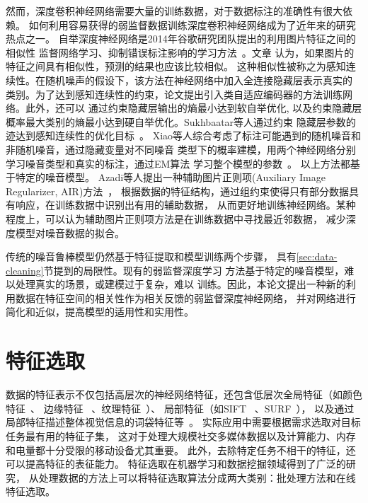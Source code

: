\documentclass[doctor]{ustcthesis}
\begin{document}
然而，深度卷积神经网络需要大量的训练数据，对于数据标注的准确性有很大依赖。
如何利用容易获得的弱监督数据训练深度卷积神经网络成为了近年来的研究热点之一。
自举深度神经网络是2014年谷歌研究团队提出的利用图片特征之间的相似性
监督网络学习、抑制错误标注影响的学习方法~\cite{reed2014training}。文章
认为，如果图片的特征之间具有相似性，预测的结果也应该比较相似。
这种相似性被称之为感知连续性。在随机噪声的假设下，该方法在神经网络中加入全连接隐藏层表示真实的
类别。为了达到感知连续性的约束，论文提出引入类自适应编码器的方法训练网络。此外，还可以
通过约束隐藏层输出的熵最小达到软自举优化,
以及约束隐藏层概率最大类别的熵最小达到硬自举优化。Sukhbaatar等人通过约束
隐藏层参数的迹达到感知连续性的优化目标~\cite{sukhbaatar2014training}。
Xiao等人综合考虑了标注可能遇到的随机噪音和非随机噪音，通过隐藏变量对不同噪音
类型下的概率建模，用两个神经网络分别学习噪音类型和真实的标注，通过EM算法
学习整个模型的参数~\cite{xiao2015learning}。 以上方法都基于特定的噪音模型。
Azadi等人提出一种辅助图片正则项(Auxiliary Image Regularizer, AIR)方法~\cite{azadi2015auxiliary}，
根据数据的特征结构，通过组约束使得只有部分数据具有响应，在训练数据中识别出有用的辅助数据，
从而更好地训练神经网络。某种程度上，可以认为辅助图片正则项方法是在训练数据中寻找最近邻数据，
减少深度模型对噪音数据的拟合。

传统的噪音鲁棒模型仍然基于特征提取和模型训练两个步骤，
具有\ref{sec:data-cleaning}节提到的局限性。现有的弱监督深度学习
方法基于特定的噪音模型，难以处理真实的场景，或建模过于复杂，难以
训练。因此，本论文提出一种新的利用数据在特征空间的相关性作为相关反馈的弱监督深度神经网络，
并对网络进行简化和近似，提高模型的适用性和实用性。

\section{特征选取}
数据的特征表示不仅包括高层次的神经网络特征，还包含低层次全局特征（如颜色特征~\cite{jain1996image}、
边缘特征~\cite{jain1996image} 、纹理特征~\cite{manjunath1996texture}）、
局部特征（如SIFT~\cite{lowe1999object} 、SURF~\cite{bay2006surf}），
以及通过局部特征描述整体视觉信息的词袋特征等~\cite{yang2007evaluating}。
实际应用中需要根据需求选取对目标任务最有用的特征子集，
这对于处理大规模社交多媒体数据以及计算能力、内存和电量都十分受限的移动设备尤其重要。
此外，去除特定任务不相干的特征，还可以提高特征的表征能力。
特征选取在机器学习和数据挖掘领域得到了广泛的研究，
从处理数据的方法上可以将特征选取算法分成两大类别：批处理方法和在线特征选取。
\end{document}
